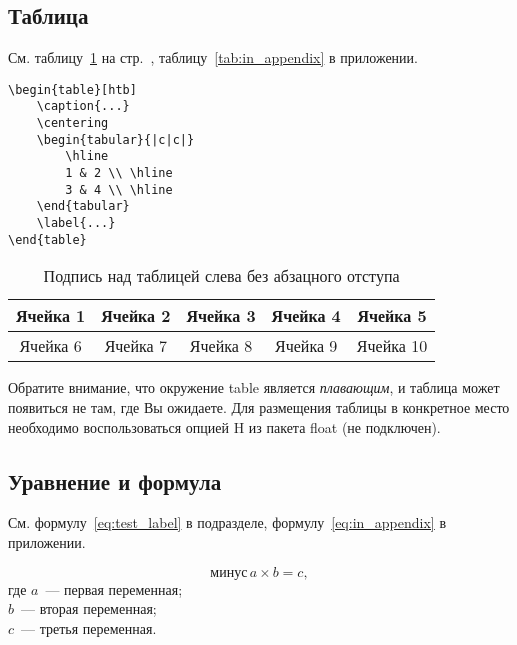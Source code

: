 \documentclass[14pt, a4paper, titlepage]{extarticle}
\let\oldprintbibliography\printbibliography
\renewcommand{\printbibliography}{\oldprintbibliography[title={Список использованных источников}]}
\begin{document}
\subsection{Таблица}

См. таблицу~\ref{tab:test_label} на стр.~\pageref{tab:test_label}, таблицу~\ref{tab:in_appendix} в приложении.

\begin{verbatim}
\begin{table}[htb]
    \caption{...}
    \centering
    \begin{tabular}{|c|c|} 
        \hline
        1 & 2 \\ \hline
        3 & 4 \\ \hline
    \end{tabular}
    \label{...}
\end{table}
\end{verbatim}

\begin{table}[htb]
    \caption{Подпись над таблицей слева без абзацного отступа}
    \centering
    \begin{tabular}{ |c|c|c|c|c| } 
        \hline
        Ячейка 1 & Ячейка 2 & Ячейка 3 & Ячейка 4 & Ячейка 5 \\ \hline
        Ячейка 6 & Ячейка 7 & Ячейка 8 & Ячейка 9 & Ячейка 10 \\ \hline
    \end{tabular}
    \label{tab:test_label}
\end{table}

Обратите внимание, что окружение table является \emph{плавающим}, и таблица может появиться не там, где Вы ожидаете. Для размещения таблицы в конкретное место необходимо воспользоваться опцией H из пакета float (не подключен).

\subsection{Уравнение и формула}

См. формулу~\ref{eq:test_label} в подразделе, формулу~\ref{eq:in_appendix} в приложении.

\begin{equation}\label{eq:test_label}
    \text{минус}\,a\times b=c ,
\end{equation}
где $a$~--- первая переменная; \\
$b$~--- вторая переменная; \\
$c$~--- третья переменная.

\printbibliography
\end{document}
